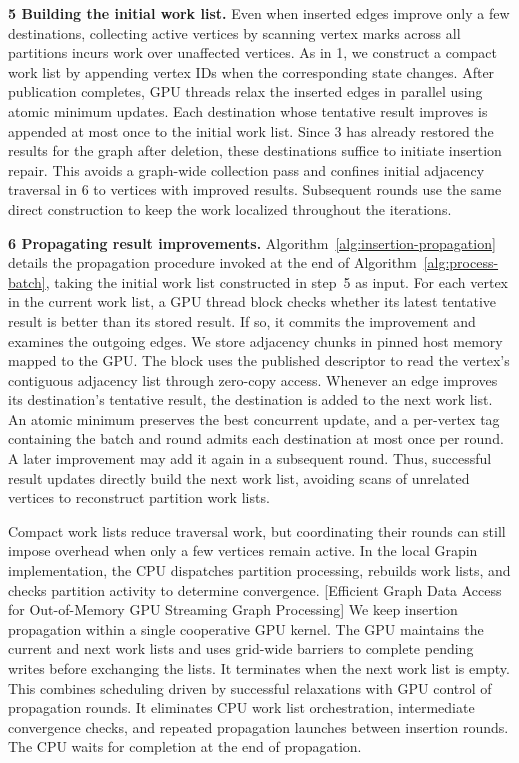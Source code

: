 \textbf{5 Building the initial work list.} Even when inserted edges improve only a few destinations, collecting active vertices by scanning vertex marks across all partitions incurs work over unaffected vertices. As in 1, we construct a compact work list by appending vertex IDs when the corresponding state changes. After publication completes, GPU threads relax the inserted edges in parallel using atomic minimum updates. Each destination whose tentative result improves is appended at most once to the initial work list. Since 3 has already restored the results for the graph after deletion, these destinations suffice to initiate insertion repair. This avoids a graph-wide collection pass and confines initial adjacency traversal in 6 to vertices with improved results. Subsequent rounds use the same direct construction to keep the work localized throughout the iterations.

\textbf{6 Propagating result improvements.} Algorithm~\ref{alg:insertion-propagation} details the propagation procedure invoked at the end of Algorithm~\ref{alg:process-batch}, taking the initial work list constructed in step~5 as input. For each vertex in the current work list, a GPU thread block checks whether its latest tentative result is better than its stored result. If so, it commits the improvement and examines the outgoing edges. We store adjacency chunks in pinned host memory mapped to the GPU. The block uses the published descriptor to read the vertex's contiguous adjacency list through zero-copy access. Whenever an edge improves its destination's tentative result, the destination is added to the next work list. An atomic minimum preserves the best concurrent update, and a per-vertex tag containing the batch and round admits each destination at most once per round. A later improvement may add it again in a subsequent round. Thus, successful result updates directly build the next work list, avoiding scans of unrelated vertices to reconstruct partition work lists.

Compact work lists reduce traversal work, but coordinating their rounds can still impose overhead when only a few vertices remain active. In the local Grapin implementation, the CPU dispatches partition processing, rebuilds work lists, and checks partition activity to determine convergence. [Efficient Graph Data Access for Out-of-Memory GPU Streaming Graph Processing] We keep insertion propagation within a single cooperative GPU kernel. The GPU maintains the current and next work lists and uses grid-wide barriers to complete pending writes before exchanging the lists. It terminates when the next work list is empty. This combines scheduling driven by successful relaxations with GPU control of propagation rounds. It eliminates CPU work list orchestration, intermediate convergence checks, and repeated propagation launches between insertion rounds. The CPU waits for completion at the end of propagation.

